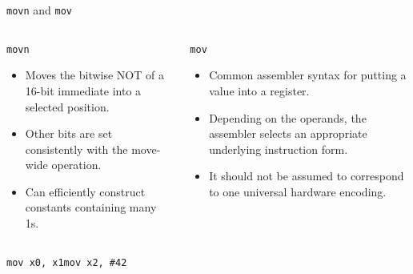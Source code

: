 \documentclass[aspectratio=169,11pt,t]{beamer}
\newcommand{\code}[1]{\texttt{#1}}
\begin{document}



\begin{frame}{\code{movn} and \code{mov}}
\begin{columns}[T,onlytextwidth]
\begin{block}{\code{movn}}
\begin{itemize}
\item Moves the bitwise NOT of a 16-bit immediate into a selected position.
\item Other bits are set consistently with the move-wide operation.
\item Can efficiently construct constants containing many 1s.
\end{itemize}
\end{block}
\begin{block}{\code{mov}}
\begin{itemize}
\item Common assembler syntax for putting a value into a register.
\item Depending on the operands, the assembler selects an appropriate underlying instruction form.
\item It should not be assumed to correspond to one universal hardware encoding.
\end{itemize}
\end{block}
\end{columns}
\vspace{0.2cm}
\large
\hspace{2.3cm}\code{mov x0, x1}\qquad\code{mov x2, \#42}
\normalsize
\end{frame}



\end{document}
